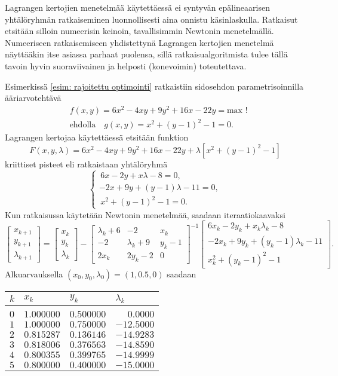 Lagrangen kertojien menetelmää käytettäessä ei syntyvän epälineaarisen yhtälöryhmän
ratkaiseminen luonnollisesti aina onnistu käsinlaskulla. Ratkaisut etsitään silloin
numeerisin keinoin, tavallisimmin Newtonin menetelmällä. Numeeriseen ratkaisemiseen
yhdistettynä Lagrangen kertojien menetelmä näyttääkin itse asiassa parhaat puolensa, 
sillä ratkaisualgoritmista tulee tällä tavoin hyvin suoraviivainen ja helposti 
(konevoimin) toteutettava. 
\begin{Exa} Esimerkissä \ref{esim: rajoitettu optimointi} ratkaistiin sidosehdon 
parametrisoinnilla ääriarvotehtävä
\begin{align*}
&f(x,y)=6x^2-4xy+9y^2+16x-22y = \text{max !} \\
&\text{ehdolla} \quad g(x,y)=x^2+(y-1)^2-1=0.
\end{align*}
Lagrangen kertojaa käytettäessä etsitään funktion
\[
F(x,y,\lambda) = 6x^2-4xy+9y^2+16x-22y + \lambda[x^2+(y-1)^2-1]
\]
kriittiset pisteet eli ratkaistaan yhtälöryhmä
\[
\begin{cases}
\,6x-2y+x\lambda-8=0, \\ -2x+9y+(y-1)\lambda-11=0, \\ \,x^2+(y-1)^2-1=0.
\end{cases}
\]
Kun ratkaisussa käytetään Newtonin menetelmää, saadaan iteraatiokaavaksi
\[
\begin{bmatrix} x_{k+1} \\ y_{k+1} \\ \lambda_{k+1} \end{bmatrix}
= \begin{bmatrix} x_k \\ y_k \\ \lambda_k \end{bmatrix}
- \begin{bmatrix} 
  \lambda_k+6 & -2 & x_k \\ -2 & \lambda_k+9 & y_k-1 \\ 2x_k & 2y_k-2 & 0
  \end{bmatrix}^{-1}
  \begin{bmatrix}
  6x_k-2y_k+x_k\lambda_k-8 \\ -2x_k+9y_k+(y_k-1)\lambda_k-11 \\ x_k^2+(y_k-1)^2-1
  \end{bmatrix}.
\]
Alkuarvauksella $(x_0,y_0,\lambda_0)=(1,0.5,0)$ saadaan
\begin{center}
\begin{tabular}{llll}
$k$ & $x_k$      & $y_k$      & $\lambda_k$  \\ \hline \\
$0$ & $1.000000$ & $0.500000$ & $\phantom{-1}0.0000$ \\
$1$ & $1.000000$ & $0.750000$ & $-12.5000$ \\
$2$ & $0.815287$ & $0.136146$ & $-14.9283$ \\
$3$ & $0.818006$ & $0.376563$ & $-14.8590$ \\
$4$ & $0.800355$ & $0.399765$ & $-14.9999$ \\
$5$ & $0.800000$ & $0.400000$ & $-15.0000$
\end{tabular}
\end{center}
\end{Exa}

